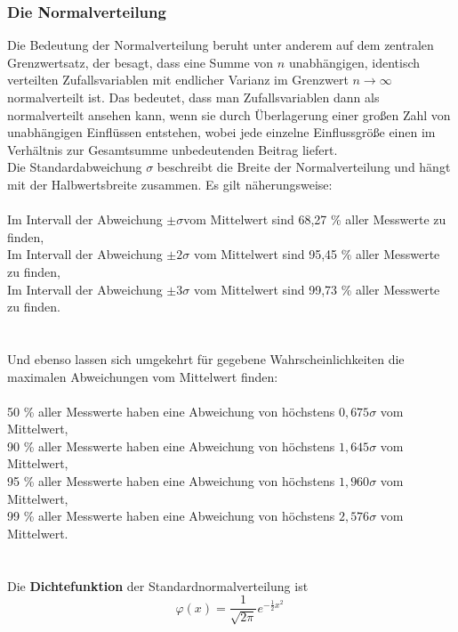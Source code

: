 \documentclass[a4paper,10pt,DIV9, BCOR12mm, oneside,openright,openbib]{scrreprt}
\theoremstyle{definition}
\theoremstyle{plain}
\begin{document}
\subsubsection{Die Normalverteilung}
Die Bedeutung der Normalverteilung beruht unter anderem auf dem zentralen Grenzwertsatz, der besagt, dass eine Summe von $ n $ unabhängigen, identisch verteilten Zufallsvariablen mit endlicher Varianz im Grenzwert $ n\rightarrow\infty $ normalverteilt ist. Das bedeutet, dass man Zufallsvariablen dann als normalverteilt ansehen kann, wenn sie durch Überlagerung einer großen Zahl von unabhängigen Einflüssen entstehen, wobei jede einzelne Einflussgröße einen im Verhältnis zur Gesamtsumme unbedeutenden Beitrag liefert.\\
Die Standardabweichung $ \sigma $ beschreibt die Breite der Normalverteilung und hängt mit der Halbwertsbreite zusammen. Es gilt näherungsweise:\\
\\
Im Intervall der Abweichung $ \pm \sigma  $vom Mittelwert sind  68,27 \% aller Messwerte zu finden,\\
Im Intervall der Abweichung $ \pm 2\sigma $ vom Mittelwert sind 95,45 \% aller Messwerte zu finden,\\
Im Intervall der Abweichung $ \pm 3\sigma $ vom Mittelwert sind 99,73 \% aller Messwerte zu finden.\\\\
\\
Und ebenso lassen sich umgekehrt für gegebene Wahrscheinlichkeiten die maximalen Abweichungen vom Mittelwert finden:\\
\\
50 \% aller Messwerte haben eine Abweichung von höchstens $ 0{,}675\sigma $ vom Mittelwert,\\
90 \% aller Messwerte haben eine Abweichung von höchstens $ 1{,}645\sigma $ vom Mittelwert,\\
95 \% aller Messwerte haben eine Abweichung von höchstens $ 1{,}960\sigma $ vom Mittelwert,\\
99 \% aller Messwerte haben eine Abweichung von höchstens $ 2{,}576\sigma $ vom Mittelwert.\\
\\\\
Die \textbf{Dichtefunktion} der Standardnormalverteilung ist
\[  \varphi(x)=\frac{1}{\sqrt{2\pi}} e^{-\frac{1}{2} x^2}\ \]
\end{document}
